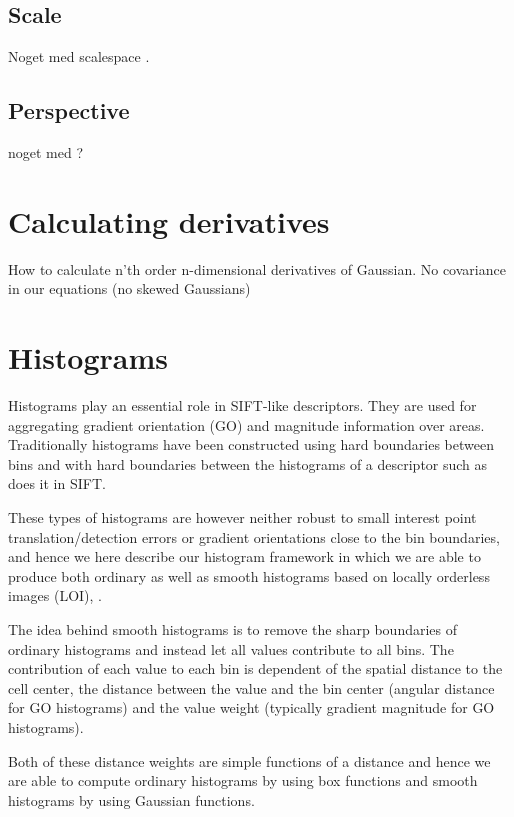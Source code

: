 \documentclass[thesis.tex]{subfiles}
\begin{document}
\subsection{Scale}
Noget med scalespace \cite{griffin1997scale}.

\subsection{Perspective}
noget med ?

\section{Calculating derivatives}
How to calculate n'th order n-dimensional derivatives of Gaussian.
No covariance in our equations (no skewed Gaussians)

\section{Histograms}

Histograms play an essential role in SIFT-like descriptors. They are used for aggregating gradient orientation (GO) and magnitude information over areas. Traditionally histograms have been constructed using hard boundaries between bins and with hard boundaries between the histograms of a descriptor such as \citet{lowe2004distinctive} does it in SIFT.

These types of histograms are however neither robust to small interest point translation/detection errors or gradient orientations close to the bin boundaries, and hence we here describe our histogram framework in which we are able to produce both ordinary as well as smooth histograms based on locally orderless images (LOI), \cite{koenderink1999structure}.

The idea behind smooth histograms is to remove the sharp boundaries of ordinary histograms and instead let all values contribute to all bins. The contribution of each value to each bin is dependent of the spatial distance to the cell center, the distance between the value and the bin center (angular distance for GO histograms) and the value weight (typically gradient magnitude for GO histograms).

Both of these distance weights are simple functions of a distance and hence we are able to compute ordinary histograms by using box functions and smooth histograms by using Gaussian functions.
\end{document}

